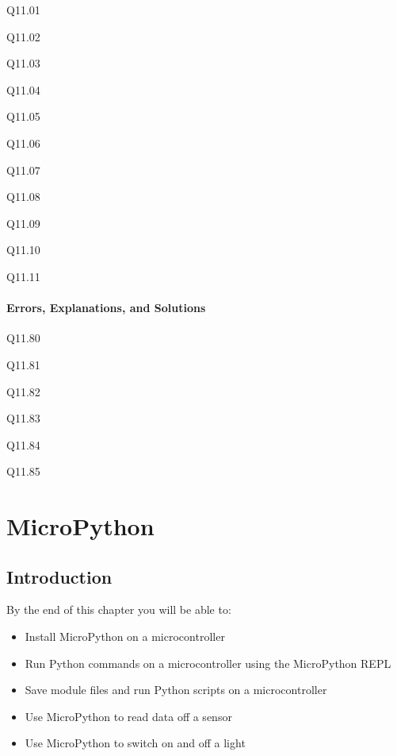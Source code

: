 \documentclass{book}
\newenvironment{problems}{}{}  %
\begin{document}
    
        \begin{problems}
        Q11.01

Q11.02

Q11.03

Q11.04

Q11.05

Q11.06

Q11.07

Q11.08

Q11.09

Q11.10

Q11.11
        \end{problems}

    




    
        \subsubsection{Errors, Explanations, and
Solutions}\label{errors-explanations-and-solutions}

Q11.80

Q11.81

Q11.82

Q11.83

Q11.84

Q11.85
    




    
        \chapter{MicroPython}\label{micropython}
    




    
        \section{Introduction}\label{introduction}
    




    
        By the end of this chapter you will be able to:

\begin{itemize}
\item
  Install MicroPython on a microcontroller
\item
  Run Python commands on a microcontroller using the MicroPython REPL
\item
  Save module files and run Python scripts on a microcontroller
\item
  Use MicroPython to read data off a sensor
\item
  Use MicroPython to switch on and off a light
\end{itemize}
        \newpage
\end{document}
